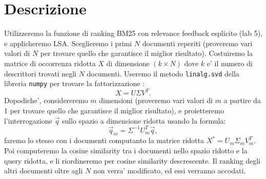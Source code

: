 \documentclass[12pt]{article}
\begin{document}
\maketitle

\section{Descrizione}
Utilizzeremo la funzione di ranking BM25 con relevance feedback esplicito (lab 5), e applicheremo LSA. Sceglieremo i primi $N$ documenti reperiti (proveremo vari valori di $N$ per trovare quello che garantisce il miglior risultato). Costuiremo la matrice di occorrenza ridotta $X$ di dimensione $(k \times N)$ dove $k$ e' il numero di descrittori trovati negli $N$ documenti. Useremo il metodo \texttt{linalg.svd} della libreria \texttt{numpy} per trovare la fattorizzazione :
\[ X = U \Sigma V^{T}. \]
Dopodiche', considereremo $m$ dimensioni (proveremo vari valori di $m$ a partire da 1 per trovare quello che garantisce il miglior risultato), e proietteremo l'interrogazione $\vec{q}$ sullo spazio a dimensione ridotta usando la formula:
\[ \vec{q}_m = \Sigma^{-1} U^{T}_m \vec{q}, \]
faremo lo stesso con i documenti computanto la matrice ridotta $X^{*} = U_m \Sigma_m V_m^{T}$.
Poi computeremo la cosine similarity tra i documenti nello spazio ridotto e la query ridotta, e li riordineremo per cosine similarity descrescente. Il ranking degli altri documenti oltre agli $N$ non verra' modificato, ed essi verranno accodati.


\end{document}
